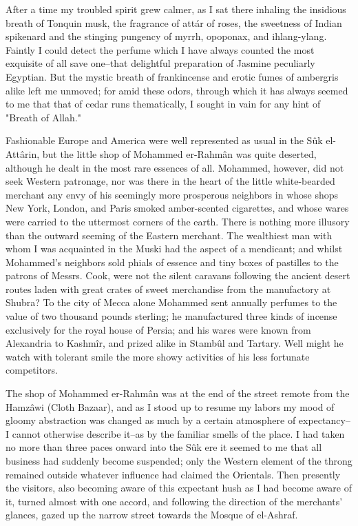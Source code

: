 After a time my troubled spirit grew calmer, as I sat there inhaling
the insidious breath of Tonquin musk, the fragrance of attár of roses,
the sweetness of Indian spikenard and the stinging pungency of myrrh,
opoponax, and ihlang-ylang. Faintly I could detect the perfume which
I have always counted the most exquisite of all save one--that
delightful preparation of Jasmine peculiarly Egyptian. But the mystic
breath of frankincense and erotic fumes of ambergris alike left me
unmoved; for amid these odors, through which it has always seemed to
me that that of cedar runs thematically, I sought in vain for any hint
of "Breath of Allah."

Fashionable Europe and America were well represented as usual in the
Sûk el-Attârin, but the little shop of Mohammed er-Rahmân was quite
deserted, although he dealt in the most rare essences of all.
Mohammed, however, did not seek Western patronage, nor was there in
the heart of the little white-bearded merchant any envy of his
seemingly more prosperous neighbors in whose shops New York, London,
and Paris smoked amber-scented cigarettes, and whose wares were
carried to the uttermost corners of the earth. There is nothing more
illusory than the outward seeming of the Eastern merchant. The
wealthiest man with whom I was acquainted in the Muski had the aspect
of a mendicant; and whilst Mohammed's neighbors sold phials of essence
and tiny boxes of pastilles to the patrons of Messrs. Cook, were not
the silent caravans following the ancient desert routes laden with
great crates of sweet merchandise from the manufactory at Shubra? To
the city of Mecca alone Mohammed sent annually perfumes to the value
of two thousand pounds sterling; he manufactured three kinds of
incense exclusively for the royal house of Persia; and his wares were
known from Alexandria to Kashmîr, and prized alike in Stambûl and
Tartary. Well might he watch with tolerant smile the more showy
activities of his less fortunate competitors.

The shop of Mohammed er-Rahmân was at the end of the street remote
from the Hamzâwi (Cloth Bazaar), and as I stood up to resume my labors
my mood of gloomy abstraction was changed as much by a certain
atmosphere of expectancy--I cannot otherwise describe it--as by the
familiar smells of the place. I had taken no more than three paces
onward into the Sûk ere it seemed to me that all business had suddenly
become suspended; only the Western element of the throng remained
outside whatever influence had claimed the Orientals. Then presently
the visitors, also becoming aware of this expectant hush as I had
become aware of it, turned almost with one accord, and following the
direction of the merchants' glances, gazed up the narrow street
towards the Mosque of el-Ashraf.

